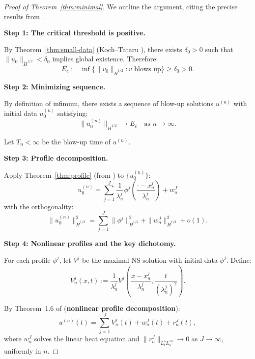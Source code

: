 \documentclass[11pt]{article}
\theoremstyle{definition}
\begin{document}
\begin{proof}[Proof of Theorem~\ref{thm:minimal}]
We outline the argument, citing the precise results from \cite{GKP, GKP2016}.

\textbf{Step 1: The critical threshold is positive.}

By Theorem~\ref{thm:small-data} (Koch--Tataru \cite{KT}), there exists $\delta_0 > 0$ such that $\|u_0\|_{\dot{H}^{1/2}} < \delta_0$ implies global existence. Therefore:
\begin{equation}
E_c := \inf\{\|v_0\|_{\dot{H}^{1/2}} : v \text{ blows up}\} \geq \delta_0 > 0.
\end{equation}

\textbf{Step 2: Minimizing sequence.}

By definition of infimum, there exists a sequence of blow-up solutions $u^{(n)}$ with initial data $u_0^{(n)}$ satisfying:
\begin{equation}
\|u_0^{(n)}\|_{\dot{H}^{1/2}} \to E_c \quad \text{as } n \to \infty.
\end{equation}

Let $T_n < \infty$ be the blow-up time of $u^{(n)}$.

\textbf{Step 3: Profile decomposition.}

Apply Theorem~\ref{thm:profile} (from \cite{Gallagher2001}) to $\{u_0^{(n)}\}$:
\begin{equation}
u_0^{(n)} = \sum_{j=1}^{J} \frac{1}{\lambda_n^j} \phi^j\left(\frac{\cdot - x_n^j}{\lambda_n^j}\right) + w_n^J
\end{equation}
with the orthogonality:
\begin{equation}\label{eq:orth}
\|u_0^{(n)}\|_{\dot{H}^{1/2}}^2 = \sum_{j=1}^{J} \|\phi^j\|_{\dot{H}^{1/2}}^2 + \|w_n^J\|_{\dot{H}^{1/2}}^2 + o(1).
\end{equation}

\textbf{Step 4: Nonlinear profiles and the key dichotomy.}

For each profile $\phi^j$, let $V^j$ be the maximal NS solution with initial data $\phi^j$. Define:
\begin{equation}
V_n^j(x,t) := \frac{1}{\lambda_n^j} V^j\left(\frac{x - x_n^j}{\lambda_n^j}, \frac{t}{(\lambda_n^j)^2}\right).
\end{equation}

By Theorem~1.6 of \cite{GKP} (\textbf{nonlinear profile decomposition}):
\begin{equation}
u^{(n)}(t) = \sum_{j=1}^{J} V_n^j(t) + w_n^J(t) + r_n^J(t),
\end{equation}
where $w_n^J$ solves the linear heat equation and $\|r_n^J\|_{L^5_t L^{10}_x} \to 0$ as $J \to \infty$, uniformly in $n$.


\end{proof}
\end{document}
